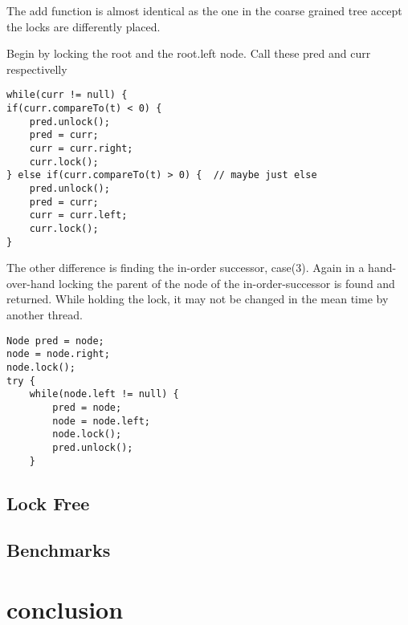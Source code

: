 \documentclass[10pt,a4paper]{article}
\begin{document}
The add function is almost identical as the one in the coarse grained tree accept the locks are differently placed.

Begin by locking the root and the root.left node. Call these pred and curr respectivelly

\begin{lstlisting}
while(curr != null) {
if(curr.compareTo(t) < 0) {
    pred.unlock();
    pred = curr;
    curr = curr.right;
    curr.lock();
} else if(curr.compareTo(t) > 0) {  // maybe just else
    pred.unlock();
    pred = curr;
    curr = curr.left;
    curr.lock();
}
\end{lstlisting}

The other difference is finding the in-order successor, case(3). Again in a hand-over-hand locking the parent of the node of the in-order-successor is found and returned. While holding the lock, it may not be changed in the mean time by another thread.

\begin{lstlisting}
Node pred = node;
node = node.right;
node.lock();
try {
    while(node.left != null) {
        pred = node;
        node = node.left;
        node.lock();
        pred.unlock();
    }
\end{lstlisting}

\subsection{Lock Free}


\subsection{Benchmarks}

\section{conclusion}
\end{document}
